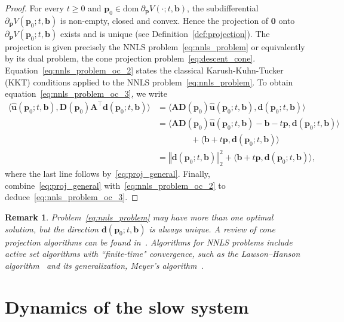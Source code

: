 \documentclass[11pt]{article}
\numberwithin{prop}{section}
\numberwithin{lem}{section}
\newtheorem{rem}{Remark}[section]
\numberwithin{rem}{section}
\numberwithin{cor}{section}
\numberwithin{thm}{section}
\numberwithin{defn}{section}
\numberwithin{fact}{section}
\theoremstyle{plain}
\def\bb {\boldsymbol{b}}
\def\bd {\boldsymbol{d}}
\def\bp {\boldsymbol{p}}
\def\bu {\boldsymbol{u}}
\newcommand{\normsq}[1]{\left\Vert{#1} \right\Vert_{2}^{2}}
\newcommand{\matr}[1]{\bm{#1}}
\def\dom {\mathrm{dom~}}    %
\def\bpo {\bp_{0}}
\def\Atop {\matr{A}^{\top}}
\begin{document}
\begin{proof} For every $t\geqslant 0$ and $\bpo \in \dom \partial_{\bp} V(\cdot;t,\bb)$, the subdifferential $\partial_{\bp} V(\bpo;t,\bb)$ is non-empty, closed and convex. Hence the projection of $\boldsymbol{0}$ onto $\partial_{\bp} V(\bpo;t,\bb)$ exists and is unique (see Definition~\ref{def:projection}). The projection is given precisely the NNLS problem~\eqref{eq:nnls_problem} or equivalently by its dual problem, the cone projection problem~\eqref{eq:descent_cone}. Equation~\eqref{eq:nnls_problem_oc_2} states the classical Karush-Kuhn-Tucker (KKT) conditions applied to the NNLS problem~\eqref{eq:nnls_problem}. To obtain equation~\eqref{eq:nnls_problem_oc_3}, we write
\[
\begin{alignedat}{1}
\langle\hat{\bu}(\bpo;t,\bb),\matr{D}(\bpo)\Atop\bd(\bpo;t,\bb)\rangle &= \langle\matr{A}\matr{D}(\bpo)\hat{\bu}(\bpo;t,\bb),\bd(\bpo;t,\bb)\rangle \\
&=\langle\matr{A}\matr{D}(\bpo)\hat{\bu}(\bpo;t,\bb) - \bb - t\bp,\bd(\bpo;t,\bb)\rangle \\
&\qquad\qquad + \langle\bb + t\bp,\bd(\bpo;t,\bb)\rangle \\
&= \normsq{\bd(\bpo;t,\bb)} + \langle\bb + t\bp,\bd(\bpo;t,\bb)\rangle,
\end{alignedat}
\]
where the last line follows by~\eqref{eq:proj_general}. Finally, combine~\eqref{eq:proj_general}	with~\eqref{eq:nnls_problem_oc_2} to deduce~\eqref{eq:nnls_problem_oc_3}.
\end{proof}
\begin{rem}\label{rem:computing_nnls}
Problem~\eqref{eq:nnls_problem} may have more than one optimal solution, but the direction $\bd(\bpo;t,\bb)$ is always unique. A review of cone projection algorithms can be found in~\cite{dimiccoli2016fundamentals}. Algorithms for NNLS problems include active set algorithms with ``finite-time" convergence, such as the Lawson--Hanson algorithm~\cite{lawson1995solving} and its generalization, Meyer's algorithm~\cite{meyer2013simple}.
\end{rem}

\section{Dynamics of the slow system}\label{sec:results}
\end{document}
